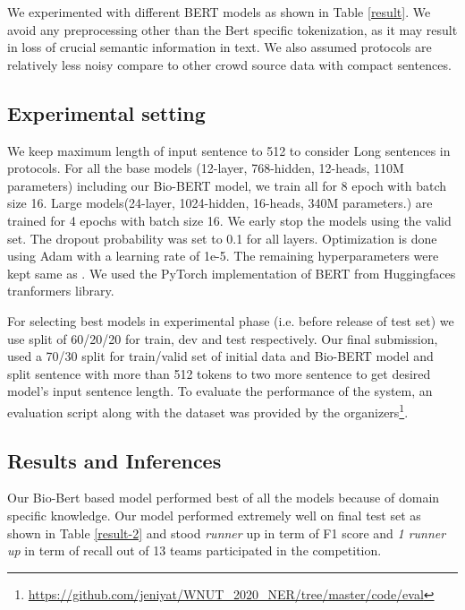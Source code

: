 \documentclass[11pt,a4paper]{article}
\begin{document}
We experimented with different BERT models as shown in Table \ref{result}. We avoid any preprocessing other than the Bert specific tokenization, as it may result in loss of crucial semantic information in text. We also assumed protocols are relatively less noisy compare to other crowd source data with  compact sentences.
\subsection{Experimental setting}
We keep maximum length of input sentence to 512 to consider Long sentences in protocols. For all the base models (12-layer, 768-hidden, 12-heads, 110M parameters) including our Bio-BERT model, we train all for 8 epoch with batch size 16. Large models(24-layer, 1024-hidden, 16-heads, 340M parameters.) are trained for 4 epochs with batch size 16. We early stop the models using the valid set. The dropout probability was set to 0.1 for all layers. Optimization is done using Adam\cite{article1} with a learning rate of 1e-5. The remaining hyperparameters were kept same as \citet{devlin2018pretraining}. We used the PyTorch \cite{NEURIPS2019_9015} implementation of BERT from Huggingfaces tranformers \cite{Wolf2019HuggingFacesTS} library.

For selecting best models in experimental phase (i.e. before release of test set) we use split of 60/20/20 for train, dev and test respectively. Our final submission, used a 70/30 split for train/valid set of initial data and Bio-BERT\cite{10.1093/bioinformatics/btz682} model and split sentence with more than 512 tokens to two more sentence to get desired  model's  input sentence length. To evaluate the performance of the system, an evaluation script along with the dataset was provided by the organizers\footnote{\url{https://github.com/jeniyat/WNUT_2020_NER/tree/master/code/eval}}.



\subsection{Results and Inferences}

Our Bio-Bert\cite{10.1093/bioinformatics/btz682} based model performed best of all the models because of domain specific knowledge. Our model performed extremely well on final test set as shown in Table \ref{result-2} and stood \textit{ runner} up in term of F1 score and\textit{ 1 runner up} in term of recall out of 13 teams participated in the competition. 
\end{document}

